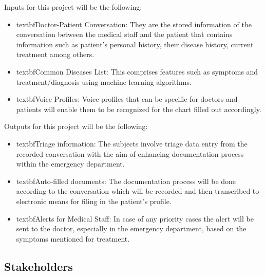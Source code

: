 \documentclass{article}
\begin{document}

Inputs for this project will be the following:

\begin{itemize}
    \item textbf{Doctor-Patient Conversation}: They are the stored information of the conversation between the medical staff and the patient that contains information such as patient’s personal history, their disease history, current treatment among others.
    \item textbf{Common Diseases List}: This comprises features such as symptoms and treatment/diagnosis using machine learning algorithms.
    \item textbf{Voice Profiles}: Voice profiles that can be specific for doctors and patients will enable them to be recognized for the chart filled out accordingly. 
\end {itemize}

Outputs for this project will be the following: 

\begin{itemize} 
    \item textbf{Triage information}: The subjects involve triage data entry from the recorded conversation with the aim of enhancing documentation process within the emergency department.
    \item textbf{Auto-filled documents}: The documentation process will be done according to the conversation which will be recorded and then transcribed to electronic means for filing in the patient’s profile.
    \item textbf{Alerts for Medical Staff}: In case of any priority cases the alert will be sent to the doctor, especially in the emergency department, based on the symptoms mentioned for treatment.
\end{itemize}  

\subsection{Stakeholders}
\end{document}
